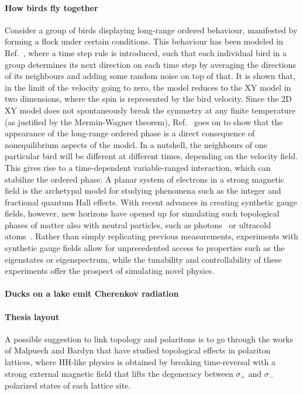 \paragraph{How birds fly together}
Consider a group of birds displaying long-range ordered behaviour,
manifested by forming a flock under certain conditions. This behaviour
has been modeled in Ref.~\cite{Toner1995}, where a time step rule is
introduced, such that each individual bird in a group determines its
next direction on each time step by averaging the directions of its
neighbours and adding some random noise on top of that. It is shown
that, in the limit of the velocity going to zero, the model reduces to
the XY model in two dimensions, where the spin is represented by the
bird velocity. Since the 2D XY model does not spontaneously break the
symmetry at any finite temperature (as justified by the Mermin-Wagner
theorem), Ref.~\cite{Toner1995} goes on to show that the appearance of
the long-range ordered phase is a direct consequence of nonequilibrium
aspects of the model. In a nutshell, the neighbours of one particular
bird will be different at different times, depending on the velocity
field. This gives rise to a time-dependent variable-ranged
interaction, which can stabilize the ordered phase.
%
A planar system of electrons in a strong magnetic field is the
archetypal model for studying phenomena such as the integer and
fractional quantum Hall effects. With recent advances in creating
synthetic gauge fields, however, new horizons have opened up for
simulating such topological phases of matter also with neutral
particles, such as photons~\cite{hafezi2014synthetic} or ultracold
atoms~\cite{dalibardrmp2011, goldman_repprog_2014,
Goldman_arxiv_2015}.  Rather than simply replicating previous
measurements, experiments with synthetic gauge fields allow for
unprecedented access to properties such as the eigenstates or
eigenspectrum, while the tunability and controllability of these
experiments offer the prospect of simulating novel physics.


\paragraph{Ducks on a lake emit Cherenkov radiation}

\paragraph{Thesis layout}

A possible suggestion to link topology and polaritons is to go through
the works of Malpuech and Bardyn that have studied topological effects
in polariton lattices, where HH-like physics is obtained by breaking
time-reversal with a strong external magnetic field that lifts the
degeneracy between $\sigma_+$ and $\sigma_-$ polarized states of each
lattice site.




